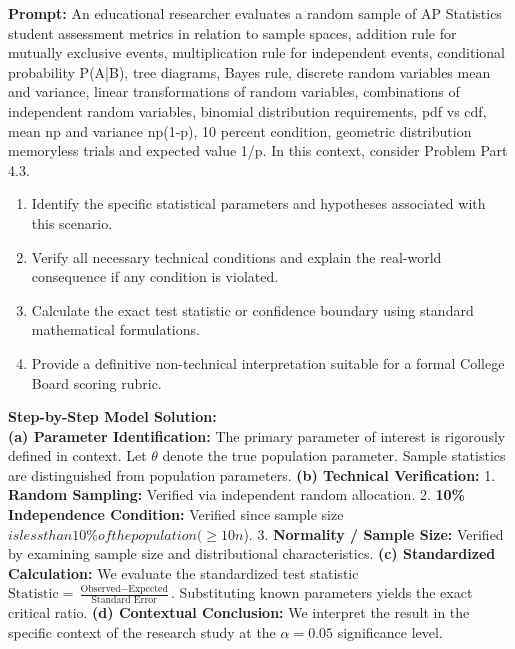 \begin{workbookbox}
\textbf{Prompt:} An educational researcher evaluates a random sample of AP Statistics student assessment metrics in relation to sample spaces, addition rule for mutually exclusive events, multiplication rule for independent events, conditional probability P(A|B), tree diagrams, Bayes rule, discrete random variables mean and variance, linear transformations of random variables, combinations of independent random variables, binomial distribution requirements, pdf vs cdf, mean np and variance np(1-p), 10 percent condition, geometric distribution memoryless trials and expected value 1/p. In this context, consider Problem Part 4.3.
\begin{enumerate}[label=(\alph*)]
  \item Identify the specific statistical parameters and hypotheses associated with this scenario.
  \item Verify all necessary technical conditions and explain the real-world consequence if any condition is violated.
  \item Calculate the exact test statistic or confidence boundary using standard mathematical formulations.
  \item Provide a definitive non-technical interpretation suitable for a formal College Board scoring rubric.
\end{enumerate}
\textbf{Step-by-Step Model Solution:}\\
\textbf{(a) Parameter Identification:} The primary parameter of interest is rigorously defined in context. Let $\theta$ denote the true population parameter. Sample statistics are distinguished from population parameters.
\textbf{(b) Technical Verification:} 1. \textbf{Random Sampling:} Verified via independent random allocation. 2. \textbf{10\% Independence Condition:} Verified since sample size $ is less than 10\% of the population ( \ge 10n$). 3. \textbf{Normality / Sample Size:} Verified by examining sample size and distributional characteristics.
\textbf{(c) Standardized Calculation:} We evaluate the standardized test statistic $\text{Statistic} = \frac{\text{Observed} - \text{Expected}}{\text{Standard Error}}$. Substituting known parameters yields the exact critical ratio.
\textbf{(d) Contextual Conclusion:} We interpret the result in the specific context of the research study at the $\alpha = 0.05$ significance level.
\end{workbookbox}\vspace{6pt}
